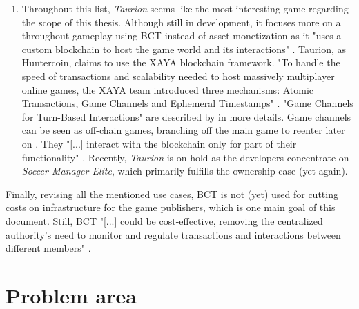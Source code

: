 \begin{enumerate}
	\item Throughout this list, \textit{Taurion} seems like the most interesting game regarding the scope of this thesis.
	Although still in development, it focuses more on a throughout gameplay using \gls{BCT} instead of asset monetization as it "uses a custom blockchain to host the game world and its interactions" \cite[29]{Laneve.2019}.
	Taurion, as Huntercoin, claims to use the XAYA blockchain framework.
	"To handle the speed of transactions and scalability needed to host massively
	multiplayer online games, the XAYA team introduced three mechanisms:
	Atomic Transactions, Game Channels and Ephemeral Timestamps" \cite[42]{Laneve.2019}.
	"Game Channels for Turn-Based Interactions" are described by \cite[90-92]{Kraft.2016} in more details.
	Game channels can be seen as off-chain games, branching off the main game to reenter later on \cite[91]{Kraft.2016}.
	They "[...] interact with the blockchain only for part of their functionality" \cite[27]{Laneve.2019}.
	Recently, \textit{Taurion} is on hold as the developers concentrate on \textit{Soccer Manager Elite}, which primarily fulfills the ownership case (yet again).
\end{enumerate}
Finally, revising all the mentioned use cases, \hyperref[chap:BCT]{BCT} is not (yet) used for cutting costs on infrastructure for the game publishers,
which is one main goal of this document.
Still, \gls{BCT} "[...] could be cost-effective, removing the centralized authority’s need to monitor and regulate transactions and interactions between different members"
\cite[5]{Sharma.2020}.



\FloatBarrier

\section{Problem area}
\label{sec:ProblemSpace}

